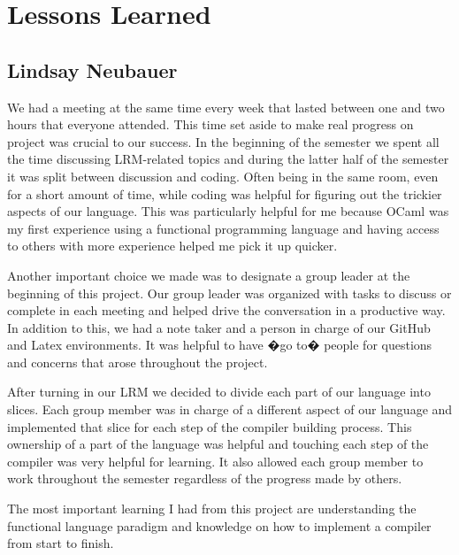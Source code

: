 \section{Lessons Learned}

\subsection{Lindsay Neubauer}
We had a meeting at the same time every week that lasted between one and two hours that everyone attended. This time set aside to make real progress on project was crucial to our success. In the beginning of the semester we spent all the time discussing LRM-related topics and during the latter half of the semester it was split between discussion and coding. Often being in the same room, even for a short amount of time, while coding was helpful for figuring out the trickier aspects of our language. This was particularly helpful for me because OCaml was my first experience using a functional programming language and having access to others with more experience helped me pick it up quicker.

Another important choice we made was to designate a group leader at the beginning of this project. Our group leader was organized with tasks to discuss or complete in each meeting and helped drive the conversation in a productive way. In addition to this, we had a note taker and a person in charge of our GitHub and Latex environments. It was helpful to have �go to� people for questions and concerns that arose throughout the project.

After turning in our LRM we decided to divide each part of our language into slices. Each group member was in charge of a different aspect of our language and implemented that slice for each step of the compiler building process. This ownership of a part of the language was helpful and touching each step of the compiler was very helpful for learning. It also allowed each group member to work throughout the semester regardless of the progress made by others.

The most important learning I had from this project are understanding the functional language paradigm and knowledge on how to implement a compiler from start to finish.

